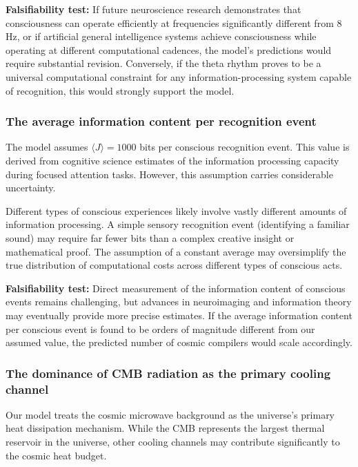 \documentclass[11pt,a4paper]{article}
\theoremstyle{definition}
\theoremstyle{remark}
\begin{document}
\textbf{Falsifiability test:} If future neuroscience research demonstrates that consciousness can operate efficiently at frequencies significantly different from 8 Hz, or if artificial general intelligence systems achieve consciousness while operating at different computational cadences, the model's predictions would require substantial revision. Conversely, if the theta rhythm proves to be a universal computational constraint for any information-processing system capable of recognition, this would strongly support the model.

\subsubsection{The average information content per recognition event}

The model assumes \(\langle J \rangle = 1000\) bits per conscious recognition event. This value is derived from cognitive science estimates of the information processing capacity during focused attention tasks. However, this assumption carries considerable uncertainty.

Different types of conscious experiences likely involve vastly different amounts of information processing. A simple sensory recognition event (identifying a familiar sound) may require far fewer bits than a complex creative insight or mathematical proof. The assumption of a constant average may oversimplify the true distribution of computational costs across different types of conscious acts.

\textbf{Falsifiability test:} Direct measurement of the information content of conscious events remains challenging, but advances in neuroimaging and information theory may eventually provide more precise estimates. If the average information content per conscious event is found to be orders of magnitude different from our assumed value, the predicted number of cosmic compilers would scale accordingly.

\subsubsection{The dominance of CMB radiation as the primary cooling channel}

Our model treats the cosmic microwave background as the universe's primary heat dissipation mechanism. While the CMB represents the largest thermal reservoir in the universe, other cooling channels may contribute significantly to the cosmic heat budget.
\end{document}

